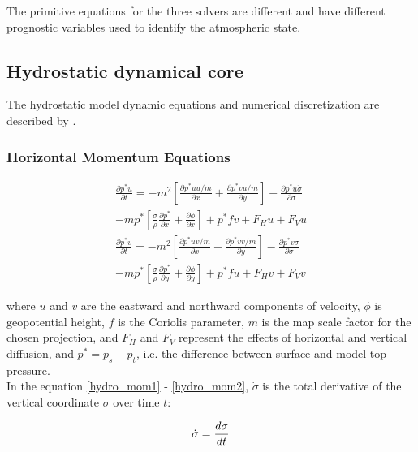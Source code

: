 The primitive equations for the three solvers are different and have different
prognostic variables used to identify the atmospheric state.

\subsection{Hydrostatic dynamical core}
The hydrostatic model dynamic equations and numerical discretization are
described by \cite{Anthes_87}.

\subsubsection{Horizontal Momentum Equations}

\begin{gather}
\label{hydro_mom1}
  \frac{\partial{p^{\ast}u}}{\partial{t}} =
  -m^2 \left[ \frac{\partial{p^{\ast}uu/m}}{\partial{x}} + 
    \frac{\partial{p^{\ast}vu/m}}{\partial{y}} \right] -
    \frac{\partial{p^{\ast}u \dot{\sigma}}}{\partial{\sigma}}
      \\ \nonumber
      -mp^{\ast} \left[ \frac{\sigma}{\rho}
      \frac{\partial{p^{\ast}}}{\partial{x}} +
      \frac{\partial{\phi}}{\partial{x}} \right] +
  p^{\ast}fv + F_Hu + F_Vu \\
\label{hydro_mom2}
  \frac{\partial{p^{\ast}v}}{\partial{t}} = 
  -m^2 \left[ \frac{\partial{p^{\ast}uv/m}}{\partial{x}} +
    \frac{\partial{p^{\ast}vv/m}}{\partial{y}} \right] -
    \frac{\partial{p^{\ast}v\dot{\sigma}}}{\partial{\sigma}}
     \\ \nonumber
     -mp^{\ast} \left[ \frac{\sigma}{\rho}
         \frac{\partial{p^{\ast}}}{\partial{y}} +
      \frac{\partial{\phi}}{\partial{y}} \right]
  + p^{\ast}fu + F_Hv + F_Vv
\end{gather}

where $u$ and $v$ are the eastward and northward components of
velocity, $\phi$ is geopotential height, $f$ is the Coriolis parameter,
$m$ is the map scale factor for the chosen projection, and $F_H$ and $F_V$
represent the effects of horizontal and vertical diffusion, and
$p^{\ast} = p_s-p_t$, i.e. the difference between surface and model top
pressure.  \\

In the equation \ref{hydro_mom1} - \ref{hydro_mom2}, $\dot{\sigma}$ is the total
derivative of the vertical coordinate $\sigma$ over time $t$:

\begin{equation}
\dot{\sigma} = {d\sigma \over dt}
\end{equation}

